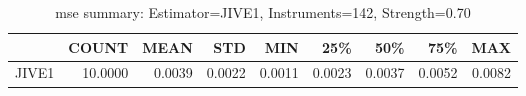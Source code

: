 \begin{table}[ht]
\centering
\caption{mse summary: Estimator=JIVE1, Instruments=142, Strength=0.70}
\begin{tabular}{lrrrrrrrr}
\toprule
 & COUNT & MEAN & STD & MIN & 25\% & 50\% & 75\% & MAX \\
\midrule
JIVE1 & 10.0000 & 0.0039 & 0.0022 & 0.0011 & 0.0023 & 0.0037 & 0.0052 & 0.0082 \\
\bottomrule
\end{tabular}
\end{table}

